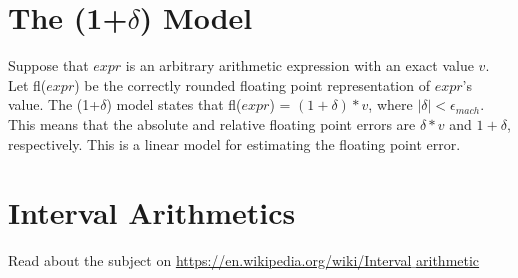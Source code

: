 \documentclass{article}
\begin{document}
\section{The (1+$\delta$) Model}
Suppose that $expr$ is an arbitrary arithmetic expression with an exact value $v$. Let fl($expr$) be the correctly rounded floating point representation of $expr$'s value. The (1+$\delta$) model states that fl($expr$) = $(1 + \delta)*v$, where $|\delta| < \epsilon_{mach}$. This means that the absolute and relative floating point errors are $\delta*v$ and $1+\delta$, respectively. This is a linear model for estimating the floating point error.

\section{Interval Arithmetics}
Read about the subject on \href{https://en.wikipedia.org/wiki/Interval_arithmetic}{https://en.wikipedia.org/wiki/Interval$\_$arithmetic}
\end{document}
